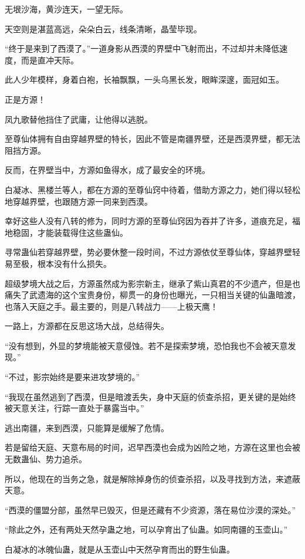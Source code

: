 
\begin{this_body}

无垠沙海，黄沙连天，一望无际。

天空则是湛蓝高远，朵朵白云，线条清晰，晶莹毕现。

“终于是来到了西漠了。”一道身影从西漠的界壁中飞射而出，不过却并未降低速度，而是直冲天际。

此人少年模样，身着白袍，长袖飘飘，一头乌黑长发，眼眸深邃，面冠如玉。

正是方源！

凤九歌替他挡住了武庸，让他得以逃脱。

至尊仙体拥有自由穿越界壁的特长，因此不管是南疆界壁，还是西漠界壁，都无法阻挡方源。

反而，在界壁当中，方源如鱼得水，成了最安全的环境。

白凝冰、黑楼兰等人，都在方源的至尊仙窍中待着，借助方源之力，她们得以轻松地穿越界壁，也跟随方源一同来到西漠。

幸好这些人没有八转的修为，同时方源的至尊仙窍因为吞并了许多，道痕充足，福地稳固，才能装载得住这些蛊仙。

寻常蛊仙若穿越界壁，势必要休整一段时间，不过方源依仗至尊仙体，穿越界壁轻易至极，根本没有什么损失。

超级梦境大战之后，方源虽然成为影宗新主，继承了紫山真君的不少遗产，但是也痛失了武遗海的这个宝贵身份，柳贯一的身份也曝光，一只相当关键的仙蛊暗渡，也落入天庭之手。最主要的，则是八转战力——上极天鹰！

一路上，方源都在反思这场大战，总结得失。

“没有想到，外显的梦境能被天意侵蚀。若不是探索梦境，恐怕我也不会被天意发现。”

“不过，影宗始终是要来进攻梦境的。”

“我现在虽然逃到了西漠，但是暗渡丢失，身中天庭的侦查杀招，更关键的是始终被天意关注，行踪一直处于暴露当中。”

逃出南疆，来到西漠，只能算是缓解了危情。

若是留给天庭、天意布局的时间，迟早西漠也会成为凶险之地，方源在这里也会被无数蛊仙、势力追杀。

所以，他现在的当务之急，就是解除掉身伤的侦查杀招，以及寻找到方法，来遮蔽天意。

“西漠的僵盟分部，虽然早已毁灭，但是还藏有不少资源，落在易位沙漠的深处。”

“除此之外，还有两处天然孕蛊之地，可以孕育出了仙蛊。如同南疆的玉壶山。”

白凝冰的冰魄仙蛊，就是从玉壶山中天然孕育而出的野生仙蛊。


\end{this_body}

